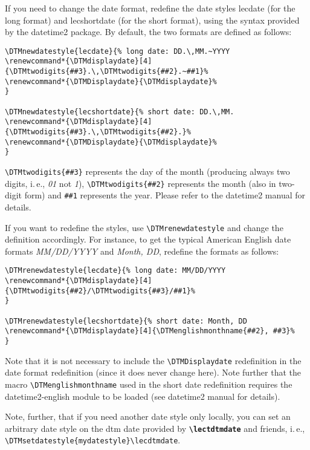 \documentclass[english]{article}
\newcommand*\jmacro[1]{\textbf{\texttt{#1}}}
\newcommand*\jcsmacro[1]{\jmacro{\textbackslash{#1}}}
\newcommand*\jfmacro[1]{\texttt{#1}}
\newcommand*\jfcsmacro[1]{\jfmacro{\textbackslash{#1}}}
\begin{document}
If you need to change the date format, redefine the date styles \textsf{lecdate}
(for the long format) and \textsf{lecshortdate} (for the short format),
using the syntax provided by the \textsf{datetime2}
package. By default, the two formats are defined as follows:
\begin{lstlisting}[language={[LaTeX]TeX},basicstyle={\small\ttfamily},frame=single,moretexcs={[1]{DTMnewdatestyle}}]
\DTMnewdatestyle{lecdate}{% long date: DD.\,MM.~YYYY
\renewcommand*{\DTMdisplaydate}[4]{\DTMtwodigits{##3}.\,\DTMtwodigits{##2}.~##1}%
\renewcommand*{\DTMDisplaydate}{\DTMdisplaydate}%
}

\DTMnewdatestyle{lecshortdate}{% short date: DD.\,MM.
\renewcommand*{\DTMdisplaydate}[4]{\DTMtwodigits{##3}.\,\DTMtwodigits{##2}.}%
\renewcommand*{\DTMDisplaydate}{\DTMdisplaydate}%
}
\end{lstlisting}
\jfcsmacro{DTMtwodigits\{\#\#3\}} represents the day of the month (producing always two digits, i.\,e., \emph{01} not \emph{1}), \jfcsmacro{DTMtwodigits\{\#\#2\}} represents the month (also in two-digit form) and \jfmacro{\#\#1} represents the year. Please refer to the \textsf{datetime2} manual for details. 

If you want to redefine the styles, use \jfcsmacro{DTMrenewdatestyle} and change the definition accordingly. For instance, to get the typical American English date formats \emph{MM/DD/YYYY} and \emph{Month, DD}, redefine the formats as follows:
\begin{lstlisting}[language={[LaTeX]TeX},basicstyle={\small\ttfamily},frame=single,moretexcs={[1]{DTMrenewdatestyle}}]
\DTMrenewdatestyle{lecdate}{% long date: MM/DD/YYYY
\renewcommand*{\DTMdisplaydate}[4]{\DTMtwodigits{##2}/\DTMtwodigits{##3}/##1}%
}

\DTMrenewdatestyle{lecshortdate}{% short date: Month, DD
\renewcommand*{\DTMdisplaydate}[4]{\DTMenglishmonthname{##2}, ##3}%
}
\end{lstlisting}
Note that it is not necessary to include the \jfcsmacro{DTMDisplaydate} redefinition in the date format redefinition (since it does never change here). Note further that the macro \jfcsmacro{DTMenglishmonthname} used in the short date redefinition requires the \textsf{datetime2-english} module to be loaded (see \textsf{datetime2} manual for details).

Note, further, that if you need another date style only locally, you can set an arbitrary date style on the dtm date provided by \jcsmacro{lectdtmdate} and friends, i.\,e., \verb|\DTMsetdatestyle{mydatestyle}\lecdtmdate|.
\end{document}
